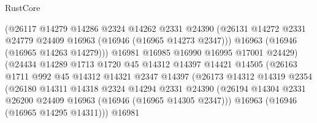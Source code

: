\begin{lexlean}{RustCore}
\begin{coremodule}
                                (@26117
                                  @14279
                                  @14286
                                  @2324
                                  @14262
                                  @2331
                                  @24390
                                  (@26131
                                    @14272
                                    @2331
                                    @24779
                                    @24409
                                    @16963
                                    (@16946 (@16965 @14273 @2347)))
                                  @16963
                                  (@16946 (@16965 @14263 @14279)))
                                @16981
                                @16985
                                @16990
                                @16995
                                @17001
                                @24429)
                              (@24434
                                @14289
                                @1713
                                @1720
                                @45
                                @14312
                                @14397
                                @14421
                                @14505
                                (@26163
                                  @1711
                                  @992
                                  @45
                                  @14312
                                  @14321
                                  @2347
                                  @14397
                                  (@26173
                                    @14312
                                    @14319
                                    @2354
                                    (@26180
                                      @14311
                                      @14318
                                      @2324
                                      @14294
                                      @2331
                                      @24390
                                      (@26194
                                        @14304
                                        @2331
                                        @26200
                                        @24409
                                        @16963
                                        (@16946 (@16965 @14305 @2347)))
                                      @16963
                                      (@16946 (@16965 @14295 @14311)))
                                    @16981

\end{coremodule}
\end{lexlean}
